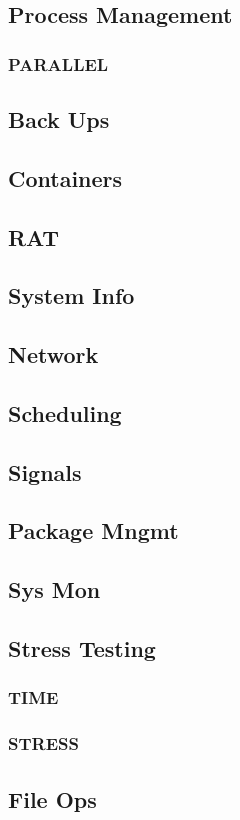 \documentclass[12pt,a4paper]{article}
\begin{document}
\subsection{Process Management}
\subsubsection{PARALLEL}
\subsection{Back Ups}
\subsection{Containers}
\subsection{RAT}
\subsection{System Info}
\subsection{Network}
\subsection{Scheduling}
\subsection{Signals}
\subsection{Package Mngmt}
\subsection{Sys Mon}
\subsection{Stress Testing}
\subsubsection{TIME}
\subsubsection{STRESS}
\subsection{File Ops}
\end{document}
